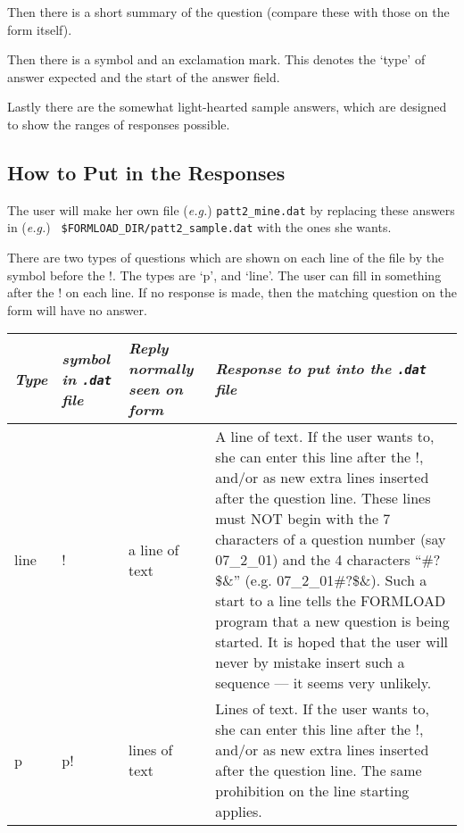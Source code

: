 Then there is a short summary of the question (compare these with those on
the form itself). 

Then there is a symbol and an exclamation mark. This denotes the `type' of
answer expected and the start of the answer field. 

Lastly there are the somewhat light-hearted sample answers, which are
designed to show the ranges of responses possible. 

\subsection{How to Put in the Responses}

The user will make her own file ({\it e.g.}) {\tt patt2\_mine.dat} by
replacing these answers in \newline ({\it e.g.}) {\tt
\$FORMLOAD\_DIR/patt2\_sample.dat} with the ones she wants. 

There are two types of questions which are shown on each line of the file
by the symbol before the !. The types are `p', and `line'. The user can
fill in something after the ! on each line. If no response is made, then
the matching question on the form will have no answer. 

{\small
\begin{tabular}{|l|p{0.6in}|p{1.2in}|p{3.5in}|} \hline
{\it Type} & {\it symbol in {\tt .dat} file}   & {\it Reply normally seen on 
form} & {\it Response to put into the {\tt .dat} file} \\ \hline
line  &     !  &   a line of text  &  A line of text. If the user wants to,
                                      she can enter this line after the !, 
                                      and/or as new extra lines inserted
                                      after the question line.
                                      These lines must NOT begin with the
                                      7 characters of a question number
                                      (say 07\_2\_01) and the 4 characters
                                      ``\#?\$\&'' (e.g. 07\_2\_01\#?\$\&). Such a
                                      start to a line tells the FORMLOAD
                                      program that a new question is
                                      being started. It is hoped that the user will
                                      never by mistake insert such a 
                                      sequence --- it seems very unlikely. \\  \hline
p     &    p!  & lines of text    &   Lines of text. If the user wants to,
                                      she can enter this line after the !, 
                                      and/or as new extra lines inserted
                                      after the question line. 
                                      The same prohibition on the line
                                      starting applies. \\  \hline
\end{tabular}}


